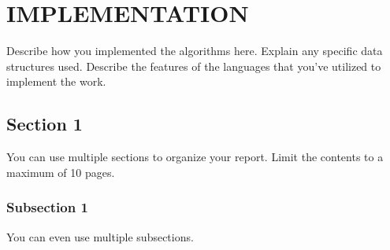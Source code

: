 \chapter{IMPLEMENTATION}
\par Describe how you implemented the algorithms here. Explain any specific data structures used. Describe the features of the languages that you've utilized to implement the work.

\section{Section 1}
\par You can use multiple sections to organize your report. Limit the contents to a maximum of 10 pages.

\subsection{Subsection 1}
\par You can even use multiple subsections.
\newpage
